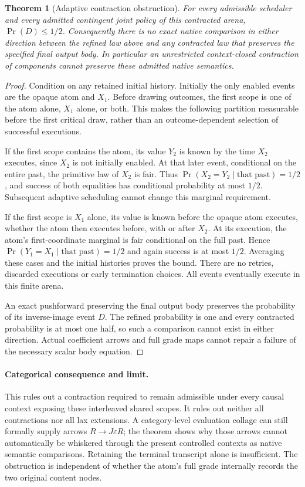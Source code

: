 \documentclass{article}
\newtheorem{theorem}{Theorem}
\begin{document}
\begin{theorem}[Adaptive contraction obstruction]
For every admissible scheduler and every admitted contingent joint policy
of this contracted arena, $\Pr(D)\leq1/2$. Consequently there is no exact
native comparison in either direction between the refined law above and any
contracted law that preserves the specified final output body. In particular
an unrestricted context-closed contraction of components cannot preserve
these admitted native semantics.
\end{theorem}
\begin{proof}
Condition on any retained initial history. Initially the only enabled events
are the opaque atom and $X_1$. Before drawing outcomes, the first scope is
one of the atom alone, $X_1$ alone, or both. This makes the following partition
measurable before the first critical draw, rather than an outcome-dependent
selection of successful executions.

If the first scope contains the atom, its value $Y_2$ is known by the time
$X_2$ executes, since $X_2$ is not initially enabled. At that later event,
conditional on the entire past, the primitive law of $X_2$ is fair. Thus
$\Pr(X_2=Y_2\mid\text{that past})=1/2$, and success of both equalities
has conditional probability at most $1/2$. Subsequent adaptive scheduling
cannot change this marginal requirement.

If the first scope is $X_1$ alone, its value is known before the opaque atom
executes, whether the atom then executes before, with or after $X_2$.
At its execution, the atom's first-coordinate marginal is fair conditional
on the full past. Hence $\Pr(Y_1=X_1\mid\text{that past})=1/2$ and again
success is at most $1/2$. Averaging these cases and the initial histories
proves the bound. There are no retries, discarded executions or early
termination choices. All events eventually execute in this finite arena.

An exact pushforward preserving the final output body preserves the
probability of its inverse-image event $D$. The refined probability is one
and every contracted probability is at most one half, so such a comparison
cannot exist in either direction. Actual coefficient arrows and full grade
maps cannot repair a failure of the necessary scalar body equation.
\end{proof}

\paragraph{Categorical consequence and limit.}
This rules out a contraction required to remain admissible under every
causal context exposing these interleaved shared scopes. It rules out neither
all contractions nor all lax extensions. A category-level evaluation collage
can still formally supply arrows $R\to J\varepsilon R$; the theorem shows
why those arrows cannot automatically be whiskered through the present
controlled contexts as native semantic comparisons. Retaining the terminal
transcript alone is insufficient. The obstruction is independent of whether
the atom's full grade internally records the two original content nodes.
\end{document}
